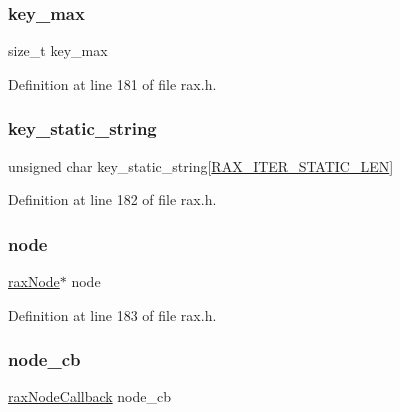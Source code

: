 \subsubsection{\texorpdfstring{key\+\_\+max}{key\_max}}
{\footnotesize\ttfamily size\+\_\+t key\+\_\+max}



Definition at line 181 of file rax.\+h.

\mbox{\label{structrax_iterator_a5854437e7714a04ea59691e0e5167883}} 
\subsubsection{\texorpdfstring{key\+\_\+static\+\_\+string}{key\_static\_string}}
{\footnotesize\ttfamily unsigned char key\+\_\+static\+\_\+string\mbox{[}\hyperlink{rax_8h_a172e740ce3572b21018192e7877217dd}{R\+A\+X\+\_\+\+I\+T\+E\+R\+\_\+\+S\+T\+A\+T\+I\+C\+\_\+\+L\+EN}\mbox{]}}



Definition at line 182 of file rax.\+h.

\mbox{\label{structrax_iterator_ae2c06018ed6b76e72dd8b8372011afa5}} 
\subsubsection{\texorpdfstring{node}{node}}
{\footnotesize\ttfamily \hyperlink{structrax_node}{rax\+Node}$\ast$ node}



Definition at line 183 of file rax.\+h.

\mbox{\label{structrax_iterator_af80d4e8e6dcdfdb2c80c37457122426c}} 
\subsubsection{\texorpdfstring{node\+\_\+cb}{node\_cb}}
{\footnotesize\ttfamily \hyperlink{rax_8h_a08d5db58149f8656e7f4d046b70a4ef1}{rax\+Node\+Callback} node\+\_\+cb}



